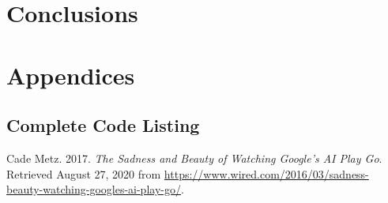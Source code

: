 \documentclass{article}
\begin{document}
\section{Conclusions}
\newpage
\section{Appendices}
\subsection{Complete Code Listing}

\begin{thebibliography}{9}
  Cade Metz. 2017.
  \textit{The Sadness and Beauty of Watching Google's AI Play Go}. 
  Retrieved August 27, 2020 from \url{https://www.wired.com/2016/03/sadness-beauty-watching-googles-ai-play-go/}.
  
  \end{thebibliography}
\end{document}
